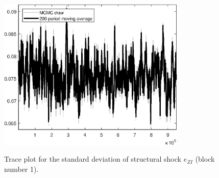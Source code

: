 \begin{figure}[H]
\centering
  \includegraphics[width=0.8\textwidth]{BRS_growth_util_sectoral/graphs/TracePlot_SE_e_ZI_blck_1}\\
    \caption{Trace plot for the standard deviation of structural shock ${e_{ZI}}$ (block number 1).}
\end{figure}
